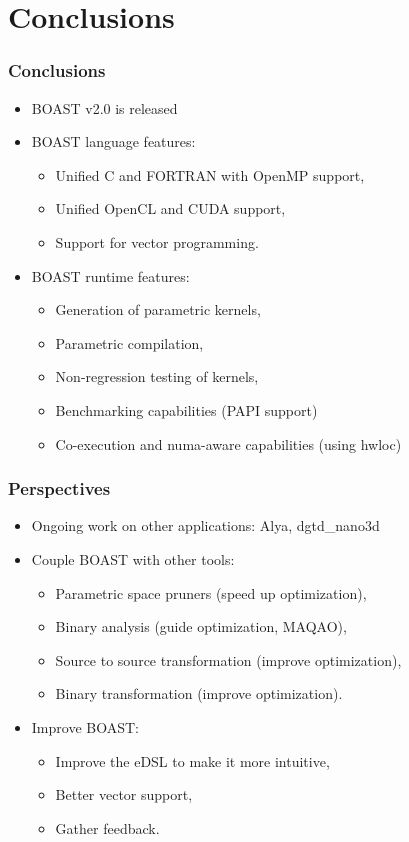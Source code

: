 \documentclass{beamer}
\begin{document}
\section{Conclusions}

\begin{frame}
  \frametitle{Conclusions}
  \begin{itemize}
    \item BOAST v2.0 is released
    \item BOAST language features:
    \begin{itemize}
      \item Unified C and FORTRAN with OpenMP support,
      \item Unified OpenCL and CUDA support,
      \item Support for vector programming.
    \end{itemize}
    \item BOAST runtime features:
    \begin{itemize}
      \item Generation of parametric kernels,
      \item Parametric compilation,
      \item Non-regression testing of kernels,
      \item Benchmarking capabilities (PAPI support)
      \item Co-execution and numa-aware capabilities (using hwloc)
    \end{itemize}
  \end{itemize}
\end{frame}

\begin{frame}
  \frametitle{Perspectives}
  \begin{itemize}
    \item Ongoing work on other applications: Alya, dgtd\_nano3d
    \item Couple BOAST with other tools:
    \begin{itemize}
      \item Parametric space pruners (speed up optimization),
      \item Binary analysis (guide optimization, MAQAO),
      \item Source to source transformation (improve optimization),
      \item Binary transformation (improve optimization).
    \end{itemize}
    \item Improve BOAST:
    \begin{itemize}
      \item Improve the eDSL to make it more intuitive,
      \item Better vector support,
      \item Gather feedback.
    \end{itemize}
  \end{itemize}
\end{frame}
\end{document}
